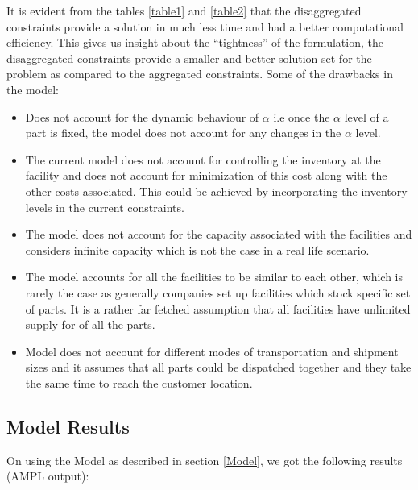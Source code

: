 \documentclass[12pt]{article}
\numberwithin{equation}{section}
\begin{document}
It is evident from the tables \ref{table1} and \ref{table2} that the disaggregated constraints provide a solution in much less time and had a better computational efficiency. This gives us insight about the “tightness” of the formulation, the disaggregated constraints provide a smaller and better solution set for the problem as compared to the aggregated constraints.
Some of the drawbacks in the model:
\begin{itemize}
\item 
Does not account for the dynamic behaviour of $\alpha$ i.e once the $\alpha$ level of a part is fixed, the model does not account for any changes in the $\alpha$ level.
\item
The current model does not account for controlling the inventory at the facility and does not account for minimization of this cost along with the other costs associated. This could be achieved by incorporating the inventory levels in the current constraints.
\item
The model does not account for the capacity associated with the facilities and considers infinite capacity which is not the case in a real life scenario.
\item
The model accounts for all the facilities to be similar to each other, which is rarely the case as generally companies set up facilities which stock specific set of parts. It is a rather far fetched assumption that all facilities have unlimited supply for of all the parts.
\item
Model does not account for different modes of transportation and shipment sizes and it assumes that all parts could be dispatched together and they take the same time to reach the customer location.
\end{itemize}

\subsection{Model Results}
On using the Model as described in section \ref{Model}, we got the following results (AMPL output):\\
\end{document}

